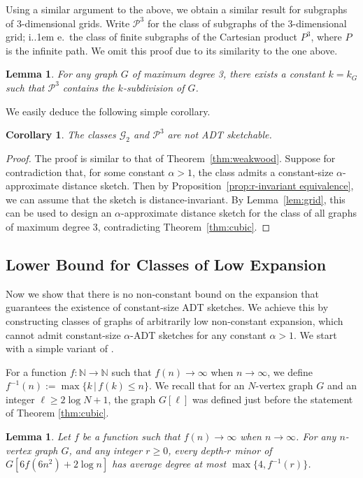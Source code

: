 \documentclass[11pt]{article}
\newcommand*\ie{i.\kern.1em e.\ }
\newtheorem{lemma}[thm]{Lemma}
\newtheorem{corollary}[thm]{Corollary}
\theoremstyle{definition}
\renewcommand{\le}{\leqslant}
\renewcommand{\ge}{\geqslant}
\def\P {{\mathcal P}}
\begin{document}
\noindent
Using a similar argument to the above, we obtain a similar result for subgraphs of 3-dimensional
grids. Write $\P^3$ for the class of subgraphs of the 3-dimensional grid; \ie the class of finite
subgraphs of the Cartesian product $P^3$, where $P$ is the infinite path. We omit this proof due to
its similarity to the one above.
\begin{lemma}\label{lem:grid3}
For any graph $G$ of maximum degree 3, there exists a constant $k=k_G$ such that
$\P^3$ contains the $k$-subdivision of $G$.
\end{lemma}

\noindent
We easily deduce the following simple corollary.

\begin{corollary}
The classes $\mathcal{G}_2$ and $\P^3$ are not ADT sketchable.
\end{corollary}
\begin{proof}
The proof is similar to that of Theorem~\ref{thm:weakwood}.  Suppose for contradiction that, for
some constant $\alpha > 1$, the class admits a constant-size $\alpha$-approximate
distance sketch. Then by Proposition~\ref{prop:r-invariant equivalence}, we can assume that the
sketch is distance-invariant. By Lemma~\ref{lem:grid}, this can be used to design an
$\alpha$-approximate distance sketch for the class of all graphs of maximum degree 3, contradicting
Theorem~\ref{thm:cubic}.
\end{proof}

\subsection{Lower Bound for Classes of Low Expansion}

Now we show that there is no non-constant bound on the expansion that guarantees the existence of
constant-size ADT sketches. We achieve this by constructing classes of graphs of arbitrarily low
non-constant expansion, which cannot admit constant-size $\alpha$-ADT sketches for any constant
$\alpha > 1$.  We start with a simple variant of \cite[Theorem 4.5]{GKRSS18}.

 

For a function $f:\mathbb{N}\to \mathbb{N}$ such that $f(n)\to\infty$ when $n\to \infty$, we define
$f^{-1}(n):=\max \{k\,|\,f(k)\le n\}$. We recall that for an
$N$-vertex graph $G$ and an integer $\ell\ge 2 \log N+1$, the graph
$G[\ell]$ was defined just before the statement of Theorem \ref{thm:cubic}.

\begin{lemma}\label{lem:GKRSS}
Let $f$ be a function such that $f(n)\to\infty$ when $n\to
\infty$. For any $n$-vertex graph $G$, and any integer $r\ge 0$, every
depth-$r$ minor of  $G[6f(6n^2)+2\log n]$ has average degree at most $\max\{4,  f^{-1}(r)\}$.
\end{lemma}
\end{document}
